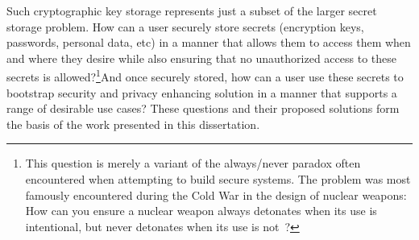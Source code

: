 Such cryptographic key storage represents just a subset of the larger
secret storage problem. How can a user securely store secrets
(encryption keys, passwords, personal data, etc) in a manner that
allows them to access them when and where they desire while also
ensuring that no unauthorized access to these secrets is
allowed?\footnote{This question is merely a variant of the
  always/never paradox often encountered when attempting to build
  secure systems. The problem was most famously encountered during the
  Cold War in the design of nuclear weapons: How can you ensure a
  nuclear weapon always detonates when its use is intentional, but
  never detonates when its use is not~\cite{schlosser2013}?}And once
securely stored, how can a user use these secrets to bootstrap
security and privacy enhancing solution in a manner that supports a
range of desirable use cases?  These questions and their proposed
solutions form the basis of the work presented in this dissertation.

